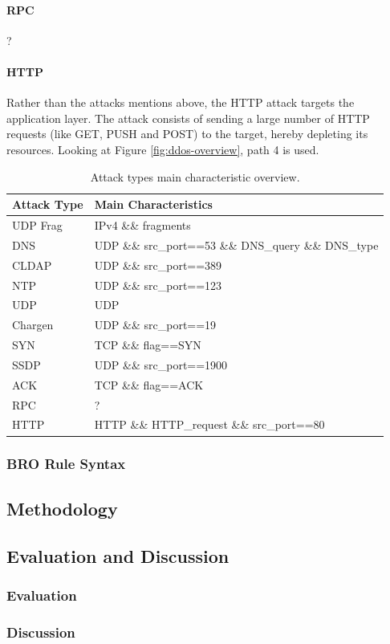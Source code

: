 \paragraph{RPC}
?

\paragraph{HTTP}
Rather than the attacks mentions above, the HTTP attack targets the application layer. The attack consists of sending a large number of HTTP requests (like GET, PUSH and POST) to the target, hereby depleting its resources. Looking at Figure \ref{fig:ddos-overview}, path 4 is used.



\begin{table}
\centering
\begin{tabular}{l | l}
Attack Type & Main Characteristics \\ \hline \hline
UDP Frag & IPv4 \&\& fragments \\ \hline
DNS & UDP \&\& src\_port==53 \&\& DNS\_query \&\& DNS\_type \\ \hline
CLDAP & UDP \&\& src\_port==389 \\ \hline
NTP & UDP \&\& src\_port==123 \\ \hline
UDP & UDP \\ \hline
Chargen & UDP \&\& src\_port==19 \\ \hline
SYN & TCP \&\& flag==SYN \\ \hline
SSDP & UDP \&\& src\_port==1900 \\ \hline
ACK & TCP \&\& flag==ACK \\ \hline
RPC & ? \\ \hline
HTTP & HTTP \&\& HTTP\_request \&\& src\_port==80
\end{tabular}
\caption{\label{tab:attack-overview}Attack types main characteristic overview.}
\end{table}


\subsubsection{BRO Rule Syntax} 


\subsection{Methodology}\label{subsec:methodology}

\subsection{Evaluation and Discussion}\label{subsec:evaluation-discussion}
\subsubsection{Evaluation}\label{subsubsec:evalutation}
\subsubsection{Discussion}\label{subsubsec:discussion}
